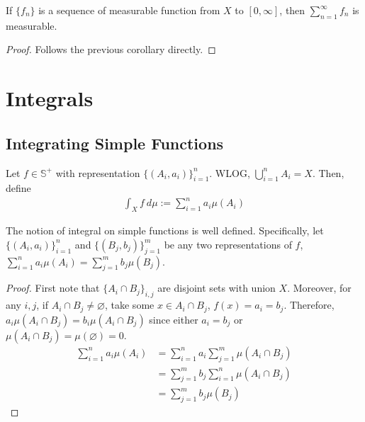 \documentclass[11pt]{article}
\begin{document}
	\begin{corollary}
		If $\{f_n\}$ is a sequence of measurable function from $X$ to $[0, \infty]$, then $\sum_{n=1}^\infty f_n$ is measurable.
		\begin{proof}
			Follows the previous corollary directly.
		\end{proof}
	\end{corollary}

	\section{Integrals}
	\subsection{Integrating Simple Functions}
	\begin{definition}
		Let $f \in \mathds{S}^+$ with representation $\{(A_i, a_i)\}_{i=1}^n$. WLOG, $\bigcup_{i=1}^n A_i = X$. Then, define
		\begin{align}
			\int_X f \ d\mu := \sum_{i=1}^n a_i \mu(A_i)
		\end{align}
	\end{definition}
	
	\begin{proposition}
		The notion of integral on simple functions is well defined. Specifically, let $\{(A_i, a_i)\}_{i=1}^n$ and $\{(B_j, b_j)\}_{j=1}^m$ be any two representations of $f$, $\sum_{i=1}^n a_i \mu(A_i) = \sum_{j=1}^m b_j \mu(B_j)$.
		\begin{proof}
			First note that $\{A_i \cap B_j\}_{i, j}$ are disjoint sets with union $X$. Moreover, for any $i, j$, if $A_i \cap B_j \neq \varnothing$, take some $x \in A_i \cap B_j$, $f(x) = a_i = b_j$. Therefore, $a_i \mu(A_i \cap B_j) = b_i \mu(A_i \cap B_j)$ since either $a_i = b_j$ or $\mu(A_i \cap B_j) = \mu(\varnothing) = 0$.
			\begin{align}
				\sum_{i=1}^n a_i \mu(A_i) &= \sum_{i=1}^n a_i \sum_{j=1}^m \mu(A_i \cap B_j) \\
				&= \sum_{j=1}^m b_j \sum_{i=1}^n \mu(A_i \cap B_j) \\
				&= \sum_{j=1}^m b_j \mu(B_j)
			\end{align}
		\end{proof}
	\end{proposition}
	
\end{document}
